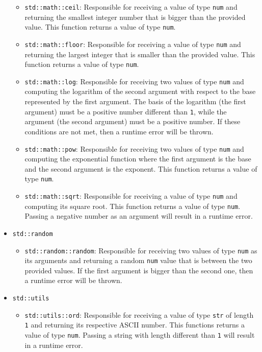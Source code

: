 \begin{itemize}
\begin{itemize}
            \item \texttt{std::math::ceil}: Responsible for receiving a value of type \texttt{num} and returning the smallest integer number that is bigger than the provided value. This function returns a value of type \texttt{num}.

            \item \texttt{std::math::floor}: Responsible for receiving a value of type \texttt{num} and returning the largest integer that is smaller than the provided value. This function returns a value of type \texttt{num}.
            
            \item \texttt{std::math::log}: Responsible for receiving two values of type \texttt{num} and computing the logarithm of the second argument with respect to the base represented by the first argument. The basis of the logarithm (the first argument) must be a positive number different than \texttt{1}, while the argument (the second argument) must be a positive number. If these conditions are not met, then a runtime error will be thrown.
            
            \item \texttt{std::math::pow}: Responsible for receiving two values of type \texttt{num} and computing the exponential function where the first argument is the base and the second argument is the exponent. This function returns a value of type \texttt{num}.
            
            \item \texttt{std::math::sqrt}: Responsible for receiving a value of type \texttt{num} and computing its square root. This function returns a value of type \texttt{num}. Passing a negative number as an argument will result in a runtime error.
            
        \end{itemize}
    \item \texttt{std::random}
        \begin{itemize}
            \item \texttt{std::random::random}: Responsible for receiving two values of type \texttt{num} as its arguments and returning a random \texttt{num} value that is between the two provided values. If the first argument is bigger than the second one, then a runtime error will be thrown.
        \end{itemize}
    \item \texttt{std::utils}
        \begin{itemize}
            \item \texttt{std::utils::ord}: Responsible for receiving a value of type \texttt{str} of length \texttt{1} and returning its respective ASCII number. This functions returns a value of type \texttt{num}. Passing a string with length different than \texttt{1} will result in a runtime error.
            

\end{itemize}
\end{itemize}
